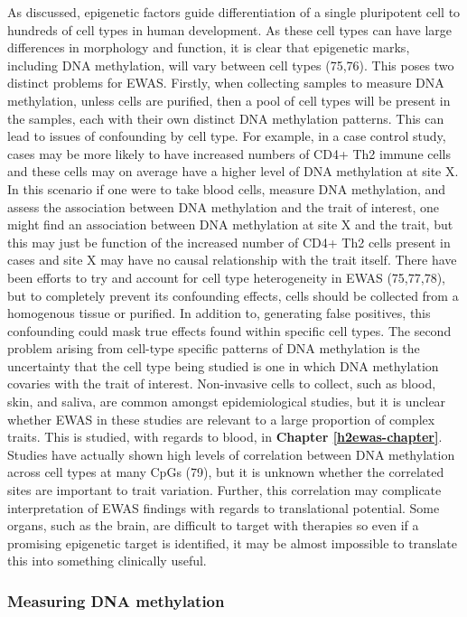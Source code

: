 \documentclass[11pt,oneside]{bristolthesis}
\begin{document}
As discussed, epigenetic factors guide differentiation of a single pluripotent cell to hundreds of cell types in human development. As these cell types can have large differences in morphology and function, it is clear that epigenetic marks, including DNA methylation, will vary between cell types (75,76). This poses two distinct problems for EWAS. Firstly, when collecting samples to measure DNA methylation, unless cells are purified, then a pool of cell types will be present in the samples, each with their own distinct DNA methylation patterns. This can lead to issues of confounding by cell type. For example, in a case control study, cases may be more likely to have increased numbers of CD4+ Th2 immune cells and these cells may on average have a higher level of DNA methylation at site X. In this scenario if one were to take blood cells, measure DNA methylation, and assess the association between DNA methylation and the trait of interest, one might find an association between DNA methylation at site X and the trait, but this may just be function of the increased number of CD4+ Th2 cells present in cases and site X may have no causal relationship with the trait itself. There have been efforts to try and account for cell type heterogeneity in EWAS (75,77,78), but to completely prevent its confounding effects, cells should be collected from a homogenous tissue or purified. In addition to, generating false positives, this confounding could mask true effects found within specific cell types. The second problem arising from cell-type specific patterns of DNA methylation is the uncertainty that the cell type being studied is one in which DNA methylation covaries with the trait of interest. Non-invasive cells to collect, such as blood, skin, and saliva, are common amongst epidemiological studies, but it is unclear whether EWAS in these studies are relevant to a large proportion of complex traits. This is studied, with regards to blood, in \textbf{Chapter \ref{h2ewas-chapter}}. Studies have actually shown high levels of correlation between DNA methylation across cell types at many CpGs (79), but it is unknown whether the correlated sites are important to trait variation. Further, this correlation may complicate interpretation of EWAS findings with regards to translational potential. Some organs, such as the brain, are difficult to target with therapies so even if a promising epigenetic target is identified, it may be almost impossible to translate this into something clinically useful.

\hypertarget{measuring-dna-methylation}{%
\subsubsection{Measuring DNA methylation}\label{measuring-dna-methylation}}
\end{document}
